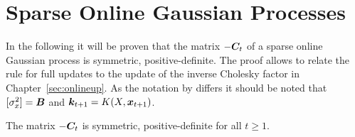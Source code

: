 \chapter{Sparse Online Gaussian Processes}\label{sec:sparse-gp-apdx}
In the following it will be proven that the matrix $-\bm{C}_t$ of a sparse 
online Gaussian process \parencite{Csato:2002fp} is symmetric, 
positive-definite. The proof allows to relate the rule for full updates to the 
update of the inverse Cholesky factor in Chapter~\ref{sec:onlineup}. As the 
notation by \textcite{Csato:2002fp} differs it should be noted that 
$[\sigma_x^2] = \bm{B}$ and $\bm{k}_{t+1} = K(X, {\bm{x}_{t+1}})$.

\begin{theorem}
    The matrix $-\bm{C}_t$ is symmetric, positive-definite for all $t \geq 1$.
\end{theorem}

